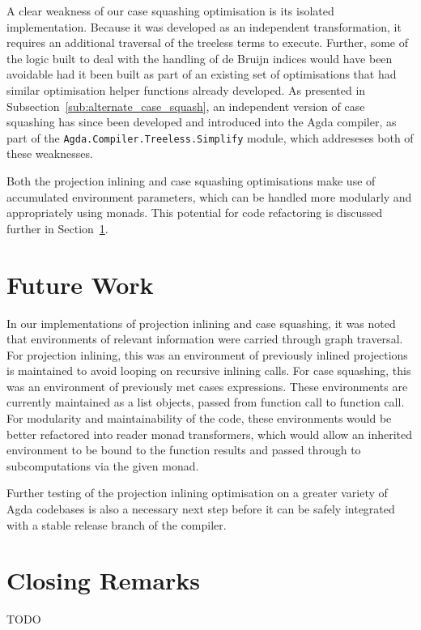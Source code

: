 A clear weakness of our case squashing optimisation is its isolated implementation. Because it was developed as an independent transformation, it requires an additional traversal of the treeless terms to execute. Further, some of the logic built to deal with the handling of de Bruijn indices would have been avoidable had it been built as part of an existing set of optimisations that had similar optimisation helper functions already developed. As presented in Subsection~\ref{sub:alternate_case_squash}, an independent version of case squashing has since been developed and introduced into the Agda compiler, as part of the \lstinline{Agda.Compiler.Treeless.Simplify} module, which addreseses both of these weaknesses.

Both the projection inlining and case squashing optimisations make use of accumulated environment parameters, which can be handled more modularly and appropriately using monads. This potential for code refactoring is discussed further in Section~\ref{sec:future_work}.

\section{Future Work}
\label{sec:future_work}

In our implementations of projection inlining and case squashing, it was noted that environments of relevant information were carried through graph traversal. For projection inlining, this was an environment of previously inlined projections is maintained to avoid looping on recursive inlining calls. For case squashing, this was an environment of previously met cases expressions. These environments are currently maintained as a list objects, passed from function call to function call. For modularity and maintainability of the code, these environments would be better refactored into reader monad transformers, which would allow an inherited environment to be bound to the function results and passed through to subcomputations via the given monad.

Further testing of the projection inlining optimisation on a greater variety of Agda codebases is also a necessary next step before it can be safely integrated with a stable release branch of the compiler.

\section{Closing Remarks}
\label{sec:closing_remarks}

TODO
